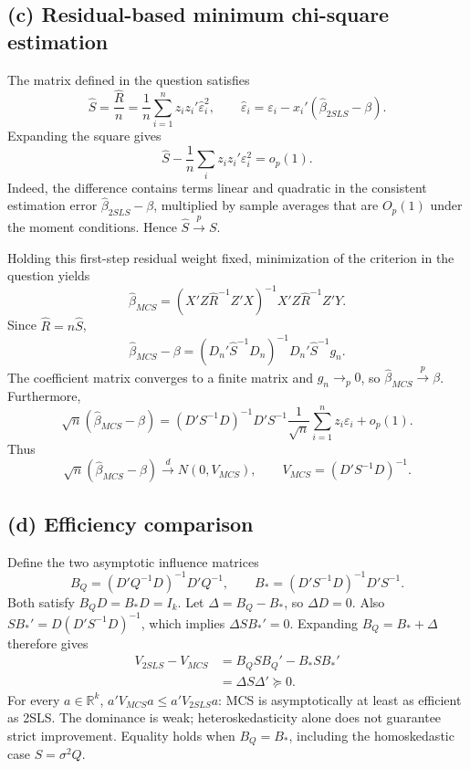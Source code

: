 \subsection*{(c) Residual-based minimum chi-square estimation}
The matrix defined in the question satisfies
\[
\widehat S=\frac{\widehat R}{n}
=\frac1n\sum_{i=1}^n z_i z_i'\widehat\varepsilon_i^2,
\qquad
\widehat\varepsilon_i
=\varepsilon_i-x_i'(\widehat\beta_{2SLS}-\beta).
\]
Expanding the square gives
\[
\widehat S-\frac1n\sum_i z_i z_i'\varepsilon_i^2=o_p(1).
\]
Indeed, the difference contains terms linear and quadratic in the
consistent estimation error $\widehat\beta_{2SLS}-\beta$,
multiplied by sample averages that are $O_p(1)$ under the moment
conditions. Hence $\widehat S\xrightarrow{p}S$.

Holding this first-step residual weight fixed, minimization of the
criterion in the question yields
\[
\widehat\beta_{MCS}
=(X'Z\widehat R^{-1}Z'X)^{-1}X'Z\widehat R^{-1}Z'Y.
\]
Since $\widehat R=n\widehat S$,
\[
\widehat\beta_{MCS}-\beta
=(D_n'\widehat S^{-1}D_n)^{-1}
 D_n'\widehat S^{-1}g_n.
\]
The coefficient matrix converges to a finite matrix and $g_n\to_p0$,
so $\boxed{\widehat\beta_{MCS}\xrightarrow{p}\beta}$.
Furthermore,
\[
\sqrt n(\widehat\beta_{MCS}-\beta)
=(D'S^{-1}D)^{-1}D'S^{-1}
\frac1{\sqrt n}\sum_{i=1}^n z_i\varepsilon_i+o_p(1).
\]
Thus
\[
\boxed{
\sqrt n(\widehat\beta_{MCS}-\beta)\xrightarrow{d}N(0,V_{MCS}),
\qquad V_{MCS}=(D'S^{-1}D)^{-1}.
}
\]

\subsection*{(d) Efficiency comparison}
Define the two asymptotic influence matrices
\[
B_Q=(D'Q^{-1}D)^{-1}D'Q^{-1},\qquad
B_*=(D'S^{-1}D)^{-1}D'S^{-1}.
\]
Both satisfy $B_QD=B_*D=I_k$. Let $\Delta=B_Q-B_*$, so $\Delta D=0$.
Also $SB_*'=D(D'S^{-1}D)^{-1}$, which implies
$\Delta SB_*'=0$. Expanding $B_Q=B_*+\Delta$ therefore gives
\[
\begin{aligned}
V_{2SLS}-V_{MCS}
&=B_QSB_Q'-B_*SB_*'\\
&=\Delta S\Delta'\succeq0.
\end{aligned}
\]
For every $a\in\mathbb R^k$,
$a'V_{MCS}a\leq a'V_{2SLS}a$: MCS is asymptotically at least as
efficient as 2SLS. The dominance is weak; heteroskedasticity alone
does not guarantee strict improvement. Equality holds when
$B_Q=B_*$, including the homoskedastic case $S=\sigma^2Q$.
